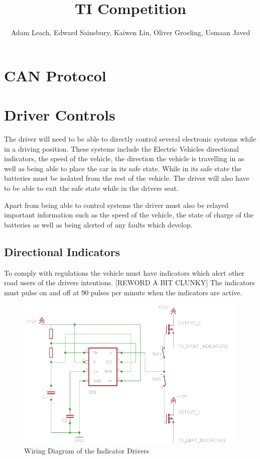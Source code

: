 \documentclass[10pt,a4paper]{article}
\begin{document}
\title{TI Competition}
\author{Adam Leach, Edward Sainsbury, Kaiwen Lin, Oliver Groeling, Usmaan Javed}
\maketitle
\tableofcontents
\section{CAN Protocol}
\section{Driver Controls}

The driver will need to be able to directly control several electronic systems while in a driving position. These systems include the Electric Vehicles directional indicators, the speed of the vehicle, the direction the vehicle is travelling in as well as being able to place the car in its safe state. While in its safe state the batteries must be isolated from the rest of the vehicle. The driver will also have to be able to exit the safe state while in the drivers seat. 

Apart from being able to control systems the driver must also be relayed important information such as the speed of the vehicle, the state of charge of the batteries as well as being alerted of any faults which develop.

\subsection{Directional Indicators}

To comply with regulations the vehicle must have indicators which alert other road users of the drivers intentions. [REWORD A BIT CLUNKY] The indicators must pulse on and off at 90 pulses per minute when the indicators are active. 

\begin{figure}[H]
\includegraphics[width=\columnwidth]{555Circuit}%
\caption{Wiring Diagram of the Indicator Drivers}
\label{Fig:IndicatorWiring}
\end{figure}
\end{document}
